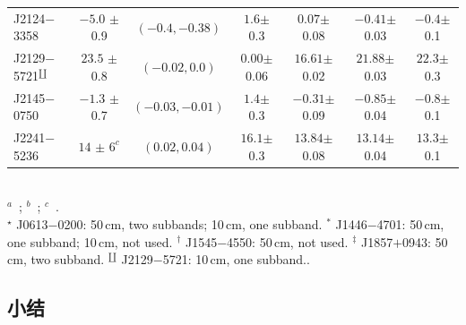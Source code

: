 \begin{landscape}
\begin{table}
\begin{tabular}{lcccccc}
J2124$-$3358            & $-5.0  $ $\pm$ 0.9      &  $(-0.4, -0.38)  $ & $1.6    $$\pm$ 0.3   & $0.07    $$\pm$ 0.08  &  $-0.41   $$\pm$ 0.03  &  $-0.4   $$\pm$ 0.1    \\  
J2129$-$5721$^\amalg$   & $23.5  $ $\pm$ 0.8      &  $(-0.02, 0.0)   $ &$0.00   $$\pm$ 0.06  & $16.61   $$\pm$ 0.02  &  $21.88   $$\pm$ 0.03  &  $22.3   $$\pm$ 0.3     \\  
J2145$-$0750            & $-1.3  $ $\pm$ 0.7      &  $(-0.03, -0.01) $ & $1.4    $$\pm$ 0.3   & $-0.31   $$\pm$ 0.09  &  $-0.85   $$\pm$ 0.04  &  $-0.8   $$\pm$ 0.1     \\  
J2241$-$5236            & $14    $ $\pm$ $6^c$    &  $(0.02, 0.04)   $ & $16.1   $$\pm$ 0.3   & $13.84   $$\pm$ 0.08  &  $13.14   $$\pm$ 0.04  &  $13.3   $$\pm$ 0.1    \\
\hline
\end{tabular}
~\\
$^a$~\cite{Keith12}; $^b$~\cite{Burgay13}; $^c$~\cite{Keith11}.
~\\
$^\star$ J0613$-$0200: 50\,cm, two subbands; 10\,cm, one subband. 
$^\ast$ J1446$-$4701: 50\,cm, one subband; 10\,cm, not used. 
$^\dagger$ J1545$-$4550: 50\,cm, not used. 
$^\ddagger$ J1857$+$0943: 50\,cm, two subband. 
$^\amalg$ J2129$-$5721: 10\,cm, one subband..
\end{table}
\end{landscape}
 
\subsection{小结}

